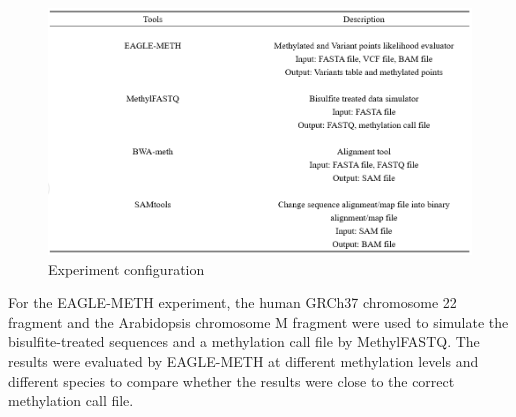 \documentclass{PHlab-thesis}
\begin{document}
\begin{figure}[h]
  \centering
  \includegraphics[scale=0.8]{figures/Table1.PNG}
  \caption{Experiment configuration}
  \label{fig:Experiment_configuration} 
\end{figure}
\par For the EAGLE-METH experiment, the human GRCh37 chromosome 22 fragment and the Arabidopsis chromosome M fragment were used to simulate the bisulfite-treated sequences and a methylation call file by MethylFASTQ. The results were evaluated by EAGLE-METH at different methylation levels and different species to compare whether the results were close to the correct methylation call file.
\end{document}
